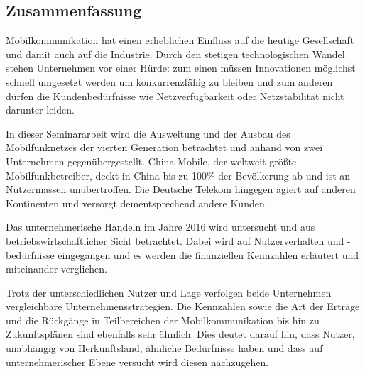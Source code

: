 \subsection*{Zusammenfassung}
\pagestyle{empty}

Mobilkommunikation hat einen erheblichen Einfluss auf die heutige Gesellschaft und damit auch auf die Industrie. Durch den stetigen technologischen Wandel stehen Unternehmen vor einer Hürde: zum einen müssen Innovationen möglichst schnell umgesetzt werden um konkurrenzfähig zu bleiben und zum anderen dürfen die Kundenbedürfnisse wie Netzverfügbarkeit oder Netzstabilität nicht darunter leiden.

In dieser Seminararbeit wird die Ausweitung und der Ausbau des Mobilfunknetzes der vierten Generation betrachtet und anhand von zwei Unternehmen gegenübergestellt. China Mobile, der weltweit größte Mobilfunkbetreiber, deckt in China bis zu 100$\%$ der Bevölkerung ab und ist an Nutzermassen unübertroffen. Die Deutsche Telekom hingegen agiert auf anderen Kontinenten und versorgt dementsprechend andere Kunden. 

Das unternehmerische Handeln im Jahre 2016 wird untersucht und aus betriebswirtschaftlicher Sicht betrachtet. Dabei wird auf Nutzerverhalten und -bedürfnisse eingegangen und es werden die finanziellen Kennzahlen erläutert und miteinander verglichen. 

Trotz der unterschiedlichen Nutzer und Lage verfolgen beide Unternehmen vergleichbare Unternehmensstrategien. Die Kennzahlen sowie die Art der Erträge und die Rückgänge in Teilbereichen der Mobilkommunikation bis hin zu Zukunftsplänen sind ebenfalls sehr ähnlich. Dies deutet darauf hin, dass Nutzer, unabhängig von Herkunftsland, ähnliche Bedürfnisse haben und dass auf unternehmerischer Ebene versucht wird diesen nachzugehen.  

